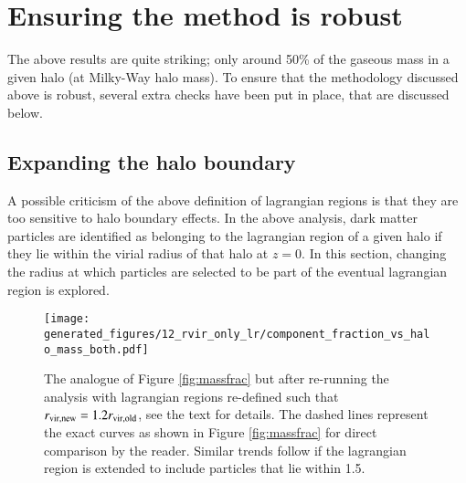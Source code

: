 \section{Ensuring the method is robust}
\label{sec:robustness}

The above results are quite striking; only around 50\% of the gaseous
mass in a given halo (at Milky-Way halo mass). To ensure that the methodology
discussed above is robust, several extra checks have been put in place, that
are discussed below.

\subsection{Expanding the halo boundary}

A possible criticism of the above definition of lagrangian regions is that
they are too sensitive to halo boundary effects. In the above analysis, dark
matter particles are identified as belonging to the lagrangian region of a
given halo if they lie within the virial radius of that halo at $z=0$. In
this section, changing the radius at which particles are selected to be part
of the eventual lagrangian region is explored.

\begin{figure}
    \centering
    \texttt{[image: generated\_figures/12\_rvir\_only\_lr/component\_fraction\_vs\_halo\_mass\_both.pdf]}
    \caption{The analogue of Figure \ref{fig:massfrac} but after re-running
    the analysis with lagrangian regions re-defined such that $r_{\rm vir,
    new} = 1.2 r_{\rm vir, old}$, see the text for details. The dashed lines
    represent the exact curves as shown in Figure \ref{fig:massfrac} for
    direct comparison by the reader. Similar trends follow if the lagrangian
    region is extended to include particles that lie within 1.5\rvir{}.}
    \label{fig:comparevirialradii}
\end{figure}

